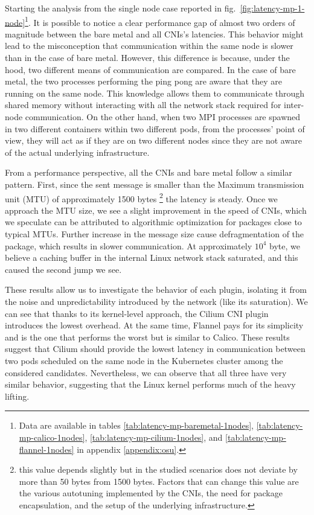 Starting the analysis from the single node case reported in
fig.~\ref{fig:latency-mp-1-node}\footnote{Data are available in tables
\ref{tab:latency-mp-baremetal-1nodes}, \ref{tab:latency-mp-calico-1nodes},
\ref{tab:latency-mp-cilium-1nodes}, and \ref{tab:latency-mp-flannel-1nodes} in
appendix \ref{appendix:osu}.}. It is possible to notice a clear performance gap
of almost two orders of magnitude between the bare metal and all CNIs's
latencies. This behavior might lead to the misconception that communication
within the same node is slower than in the case of bare metal. However, this
difference is because, under the hood, two different means of communication are
compared. In the case of bare metal, the two processes performing the ping pong
are aware that they are running on the same node. This knowledge allows them to
communicate through shared memory without interacting with all the network stack
required for inter-node communication. On the other hand, when two MPI processes
are spawned in two different containers within two different pods, from the
processes' point of view, they will act as if they are on two different nodes
since they are not aware of the actual underlying infrastructure.

From a performance perspective, all the CNIs and bare metal follow a similar
pattern. First, since the sent message is smaller than the Maximum transmission
unit (MTU) of approximately 1500 bytes \footnote{this value depends slightly but
in the studied scenarios does not deviate by more than 50 bytes from 1500 bytes.
Factors that can change this value are the various autotuning implemented by the
CNIs, the need for package encapsulation, and the setup of the underlying
infrastructure.} the latency is steady. Once we approach the MTU size, we see a
slight improvement in the speed of CNIs, which we speculate can be attributed to
algorithmic optimization for packages close to typical MTUs. Further increase in
the message size cause defragmentation of the package, which results in slower
communication. At approximately $10^4$ byte, we believe a caching buffer in the
internal Linux network stack saturated, and this caused the second jump we see.


These results allow us to investigate the behavior of each plugin, isolating it
from the noise and unpredictability introduced by the network (like its
saturation). We can see that thanks to its kernel-level approach, the Cilium CNI
plugin introduces the lowest overhead. At the same time, Flannel pays for its
simplicity and is the one that performs the worst but is similar to Calico.
These results suggest that Cilium should provide the lowest latency in
communication between two pods scheduled on the same node in the Kubernetes
cluster among the considered candidates. Nevertheless, we can observe that all
three have very similar behavior, suggesting that the Linux kernel performs much
of the heavy lifting.


